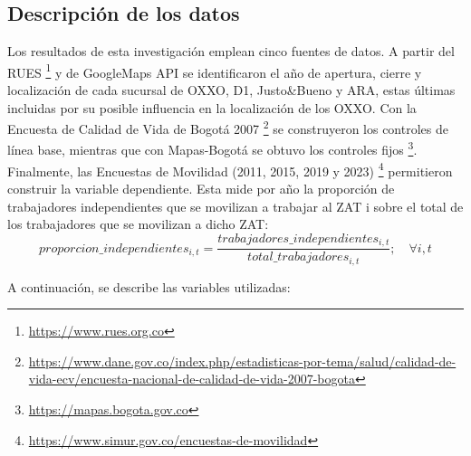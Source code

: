 \documentclass{article}
\begin{document}
\subsection{Descripción de los datos}
Los resultados de esta investigación emplean cinco fuentes de datos. A partir del RUES \footnote{\url{https://www.rues.org.co}} y de GoogleMaps API se identificaron el año de apertura, cierre y localización de cada sucursal de OXXO, D1, Justo\&Bueno y ARA, estas últimas incluidas por su posible influencia en la localización de los OXXO. Con la Encuesta de Calidad de Vida de Bogotá 2007 \footnote{\url{https://www.dane.gov.co/index.php/estadisticas-por-tema/salud/calidad-de-vida-ecv/encuesta-nacional-de-calidad-de-vida-2007-bogota}} se construyeron los controles de línea base, mientras que con Mapas-Bogotá se obtuvo los controles fijos \footnote{\url{https://mapas.bogota.gov.co}}. Finalmente, las Encuestas de Movilidad (2011, 2015, 2019 y 2023) \footnote{\url{https://www.simur.gov.co/encuestas-de-movilidad}} permitieron construir la variable dependiente. Esta mide por año la proporción de trabajadores independientes que se movilizan a trabajar al ZAT i sobre el total de los trabajadores que se movilizan a dicho ZAT:\\

\begin{equation}
    proporcion\_independientes_{i,t}=\frac{trabajadores\_independientes_{i,t}}{total\_trabajadores_{i,t}} ; \quad \forall i, t
\end{equation}


A continuación, se describe las variables utilizadas:
\end{document}
